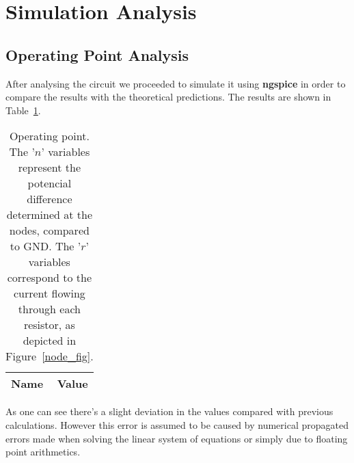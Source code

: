 \section{Simulation Analysis}
\label{sec:simulation}

\subsection{Operating Point Analysis}

After analysing the circuit we proceeded to simulate it using {\bf ngspice} in order to compare the results with the theoretical predictions. The results are shown in Table~\ref{tab:op}.


\begin{table}[h]
	\centering
	\begin{tabular}{|l|r|}
		\hline    
		{\bf Name} & {\bf Value} \\ \hline
		
	\end{tabular}
	\caption{Operating point. The '$n$' variables represent the potencial difference determined at the nodes, compared to GND. The '$r$' variables correspond to the current flowing through each resistor, as depicted in Figure~\ref{node_fig}.}
	\label{tab:op}
\end{table}

As one can see there's a slight deviation in the values compared with previous calculations. However this error is assumed to be caused by numerical propagated errors made when solving the linear system of equations or simply due to floating point arithmetics. %
